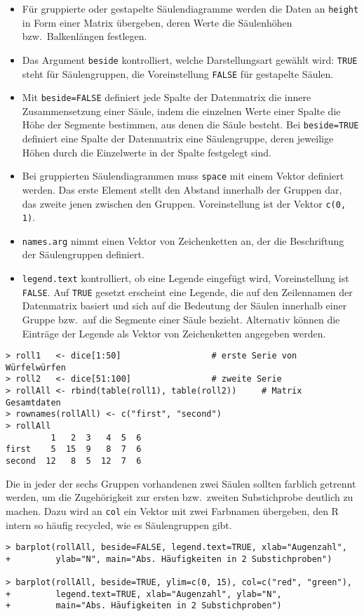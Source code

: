 \begin{itemize}
\item Für gruppierte oder gestapelte Säulendiagramme werden die Daten an \lstinline!height! in Form einer Matrix übergeben, deren Werte die Säulenhöhen bzw.\ Balkenlängen festlegen.
\item Das Argument \lstinline!beside! kontrolliert, welche Darstellungsart gewählt wird: \lstinline!TRUE! steht für Säulengruppen, die Voreinstellung \lstinline!FALSE! für gestapelte Säulen.
\item Mit \lstinline!beside=FALSE! definiert jede Spalte der Datenmatrix die innere Zusammensetzung einer Säule, indem die einzelnen Werte einer Spalte die Höhe der Segmente bestimmen, aus denen die Säule besteht. Bei \lstinline!beside=TRUE! definiert eine Spalte der Datenmatrix eine Säulengruppe, deren jeweilige Höhen durch die Einzelwerte in der Spalte festgelegt sind.
\item Bei gruppierten Säulendiagrammen muss \lstinline!space! mit einem Vektor definiert werden. Das erste Element stellt den Abstand innerhalb der Gruppen dar, das zweite jenen zwischen den Gruppen. Voreinstellung ist der Vektor \lstinline!c(0, 1)!.
\item \lstinline!names.arg! nimmt einen Vektor von Zeichenketten an, der die Beschriftung der Säulengruppen definiert.
\item \lstinline!legend.text! kontrolliert, ob eine Legende eingefügt wird, Voreinstellung ist \lstinline!FALSE!\@. Auf \lstinline!TRUE! gesetzt erscheint eine Legende, die auf den Zeilennamen der Datenmatrix basiert und sich auf die Bedeutung der Säulen innerhalb einer Gruppe bzw.\ auf die Segmente einer Säule bezieht. Alternativ können die Einträge der Legende als Vektor von Zeichenketten angegeben werden.
\end{itemize}

\begin{lstlisting}
> roll1   <- dice[1:50]                  # erste Serie von Würfelwürfen
> roll2   <- dice[51:100]                # zweite Serie
> rollAll <- rbind(table(roll1), table(roll2))     # Matrix Gesamtdaten
> rownames(rollAll) <- c("first", "second")
> rollAll
         1   2  3   4  5  6
first    5  15  9   8  7  6
second  12   8  5  12  7  6
\end{lstlisting}

Die in jeder der sechs Gruppen vorhandenen zwei Säulen sollten farblich getrennt werden, um die Zugehörigkeit zur ersten bzw.\ zweiten Substichprobe deutlich zu machen. Dazu wird an \lstinline!col! ein Vektor mit zwei Farbnamen übergeben, den R intern so häufig recycled, wie es Säulengruppen gibt.
\begin{lstlisting}
> barplot(rollAll, beside=FALSE, legend.text=TRUE, xlab="Augenzahl",
+         ylab="N", main="Abs. Häufigkeiten in 2 Substichproben")

> barplot(rollAll, beside=TRUE, ylim=c(0, 15), col=c("red", "green"),
+         legend.text=TRUE, xlab="Augenzahl", ylab="N",
+         main="Abs. Häufigkeiten in 2 Substichproben")
\end{lstlisting}

